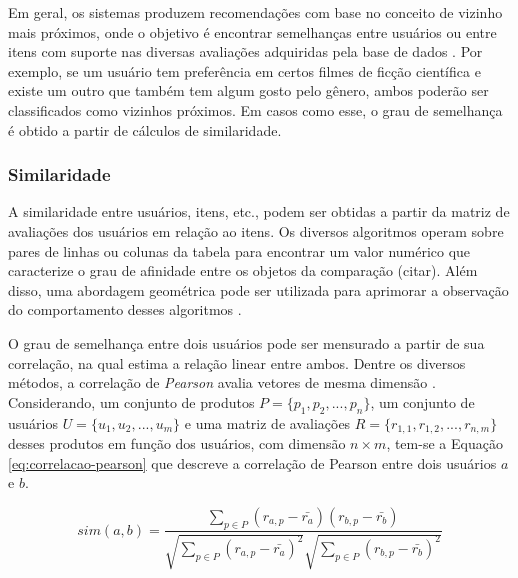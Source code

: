         Em geral, os sistemas produzem recomendações com base no conceito de vizinho mais próximos, onde o objetivo é encontrar semelhanças entre usuários ou entre itens com suporte nas diversas avaliações adquiridas pela base de dados \cite{Mustafa2017}. Por exemplo, se um usuário tem preferência em certos filmes de ficção científica e existe um outro que também tem algum gosto pelo gênero, ambos poderão ser classificados como vizinhos próximos. Em casos como esse, o grau de semelhança é obtido a partir de cálculos de similaridade.
        
        \subsubsection{Similaridade}    
        
        A similaridade entre usuários, itens, etc., podem ser obtidas a partir da matriz de avaliações dos usuários em relação ao itens. Os diversos algoritmos operam sobre pares de linhas ou colunas da tabela para encontrar um valor numérico que caracterize o grau de afinidade entre os objetos da comparação (citar). Além disso, uma abordagem geométrica pode ser utilizada para aprimorar a observação do comportamento desses algoritmos \cite{Jones1987}.
        
        O grau de semelhança entre dois usuários pode ser mensurado a partir de sua correlação, na qual estima a relação linear entre ambos. Dentre os diversos métodos, a correlação de \textit{Pearson} avalia vetores de mesma dimensão \cite{Ricci2010}. Considerando, um conjunto de produtos $P=\{p_1, p_2, ..., p_n\}$, um conjunto de usuários $U = \{u_1, u_2, ..., u_m\}$ e uma matriz de avaliações $R=\{r_{1,1}, r_{1,2}, ..., r_{n, m}\}$ desses produtos em função dos usuários, com dimensão  $n\times m$, tem-se a Equação \ref{eq:correlacao-pearson} que descreve a correlação de Pearson entre dois usuários $a$ e $b$.
             
        \begin{equation}
             sim(a, b) = \frac{\sum_{p\in P}(r_{a, p}-\bar{r_a})(r_{b, p}-\bar{r_b})}{\sqrt{\sum_{p\in P}(r_{a, p}-\bar{r_a})^2}\sqrt{\sum_{p\in P}(r_{b, p}-\bar{r_b})^2}}\label{eq:correlacao-pearson}
        \end{equation}
        
